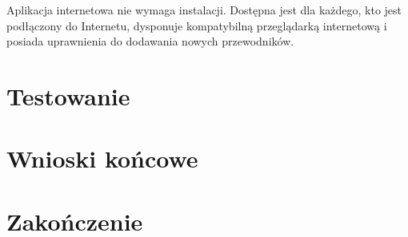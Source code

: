 \documentclass{book}
\begin{document}
		Aplikacja internetowa nie wymaga instalacji. Dostępna jest dla każdego, kto jest podłączony do Internetu, dysponuje kompatybilną przeglądarką internetową i posiada uprawnienia do dodawania nowych przewodników. 
		
	\chapter{Testowanie}
	
	\chapter{Wnioski końcowe}
	
	\chapter{Zakończenie}
	
	
	
	
	
\end{document}
